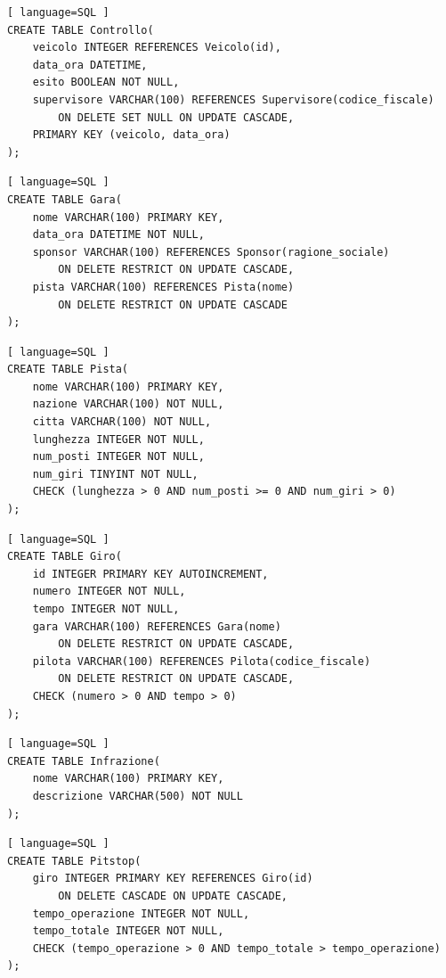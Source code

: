 \documentclass[11pt]{article}
\begin{document}
\begin{lstlisting}[ language=SQL ]
CREATE TABLE Controllo(
    veicolo INTEGER REFERENCES Veicolo(id),
    data_ora DATETIME,
    esito BOOLEAN NOT NULL,
    supervisore VARCHAR(100) REFERENCES Supervisore(codice_fiscale) 
        ON DELETE SET NULL ON UPDATE CASCADE,
    PRIMARY KEY (veicolo, data_ora)
);
\end{lstlisting}

\newpage
\begin{lstlisting}[ language=SQL ]
CREATE TABLE Gara(
    nome VARCHAR(100) PRIMARY KEY,
    data_ora DATETIME NOT NULL,
    sponsor VARCHAR(100) REFERENCES Sponsor(ragione_sociale) 
        ON DELETE RESTRICT ON UPDATE CASCADE,
    pista VARCHAR(100) REFERENCES Pista(nome) 
        ON DELETE RESTRICT ON UPDATE CASCADE
);
\end{lstlisting}

\begin{lstlisting}[ language=SQL ]
CREATE TABLE Pista(
    nome VARCHAR(100) PRIMARY KEY,
    nazione VARCHAR(100) NOT NULL,
    citta VARCHAR(100) NOT NULL,
    lunghezza INTEGER NOT NULL,
    num_posti INTEGER NOT NULL,
    num_giri TINYINT NOT NULL,
    CHECK (lunghezza > 0 AND num_posti >= 0 AND num_giri > 0)
);
\end{lstlisting}

\begin{lstlisting}[ language=SQL ]
CREATE TABLE Giro(
    id INTEGER PRIMARY KEY AUTOINCREMENT,
    numero INTEGER NOT NULL,
    tempo INTEGER NOT NULL,
    gara VARCHAR(100) REFERENCES Gara(nome) 
        ON DELETE RESTRICT ON UPDATE CASCADE,
    pilota VARCHAR(100) REFERENCES Pilota(codice_fiscale) 
        ON DELETE RESTRICT ON UPDATE CASCADE,
    CHECK (numero > 0 AND tempo > 0)
);
\end{lstlisting}

\begin{lstlisting}[ language=SQL ]
CREATE TABLE Infrazione(
    nome VARCHAR(100) PRIMARY KEY,
    descrizione VARCHAR(500) NOT NULL
);
\end{lstlisting}

\begin{lstlisting}[ language=SQL ]
CREATE TABLE Pitstop(
    giro INTEGER PRIMARY KEY REFERENCES Giro(id) 
        ON DELETE CASCADE ON UPDATE CASCADE,
    tempo_operazione INTEGER NOT NULL,
    tempo_totale INTEGER NOT NULL,
    CHECK (tempo_operazione > 0 AND tempo_totale > tempo_operazione)
);
\end{lstlisting}
\end{document}
